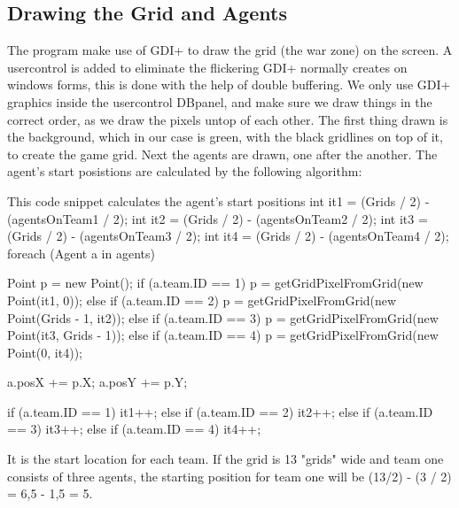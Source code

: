 \subsection*{Drawing the Grid and Agents}
\label{sec:drawing}
The program make use of GDI+ \cite{misc:gdiplus} to draw the grid (the war zone) on the screen. A usercontrol is added to eliminate the flickering GDI+ normally creates on windows forms, this is done with the help of double buffering.
We only use GDI+ graphics inside the usercontrol DBpanel, and make sure we draw things in the correct order, as we draw the pixels untop of each other. The first thing drawn is the background, which in our case is green, with the black gridlines on top of it, to create the game grid. Next the agents are drawn, one after the another.
The agent's start posistions are calculated by the following algorithm:
\begin{source}{This code snippet calculates the agent's start positions}{}                 
            int it1 = (Grids / 2) - (agentsOnTeam1 / 2);
            int it2 = (Grids / 2) - (agentsOnTeam2 / 2);
            int it3 = (Grids / 2) - (agentsOnTeam3 / 2);
            int it4 = (Grids / 2) - (agentsOnTeam4 / 2);
            foreach (Agent a in agents)
            {
                Point p = new Point();
                if (a.team.ID == 1)
                {
                    p = getGridPixelFromGrid(new Point(it1, 0));
                }
                else if (a.team.ID == 2)
                {
                    p = getGridPixelFromGrid(new Point(Grids - 1, it2));
                }
                else if (a.team.ID == 3)
                {
                    p = getGridPixelFromGrid(new Point(it3, Grids - 1));
                }
                else if (a.team.ID == 4)
                {
                    p = getGridPixelFromGrid(new Point(0, it4));
                }

                a.posX += p.X;
                a.posY += p.Y;

                if (a.team.ID == 1)
                {
                    it1++;
                }
                else if (a.team.ID == 2)
                {
                    it2++;
                }
                else if (a.team.ID == 3)
                {
                    it3++;
                }
                else if (a.team.ID == 4)
                {
                    it4++;
                }
            }
\end{source}
It is the start location for each team. If the grid is 13 "grids" wide and team one consists of three agents, the starting position for team one will be (13/2) - (3 / 2) = 6,5 - 1,5 = 5.